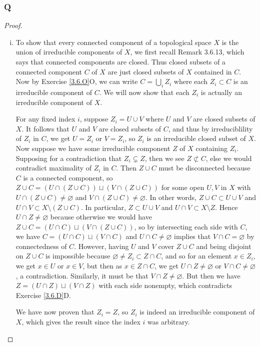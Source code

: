 \documentclass{article}
\newcommand{\nsubset}{\not \subset}
\let\emptyset\varnothing
\begin{document}
\subsubsection{Q}\label{3.6.Q}
\begin{proof}
    \begin{enumerate}[(i)]
        \item To show that every connected component of a topological space $X$ is the union of irreducible components of $X$, we first recall Remark 3.6.13, which says that connected components are closed. Thus closed subsets of a connected component $C$ of $X$ are just closed subsets of $X$ contained in $C$. Now by Exercise \ref{3.6.O}O, we can write $C=\bigcup_i Z_i$ where each $Z_i \subset C$ is an irreducible component of $C$. We will now show that each $Z_i$ is actually an irreducible component of $X$. 
        
        For any fixed index $i$, suppose $Z_i = U \cup V$ where $U$ and $V$ are closed subsets of $X$. It follows that $U$ and $V$ are closed subsets of $C$, and thus by irreduciblility of $Z_i$ in $C$, we get $U=Z_i$ or $V=Z_i$, so $Z_i$ is an irreducible closed subset of $X$. Now suppose we have some irreducible component $Z$ of $X$ containing $Z_i$. Supposing for a contradiction that $Z_i\subsetneq Z$, then we see $Z\nsubset C$, else we would contradict maximality of $Z_i$ in $C$. Then $Z\cup C$ must be disconnected because $C$ is a connected component, so $Z\cup C = (U \cap (Z\cup C)) \sqcup (V \cap (Z\cup C))$ for some open $U,V$ in $X$ with $U\cap (Z\cup C) \ne \emptyset$ and $V\cap (Z\cup C) \ne \emptyset$. In other words, $Z\cup C\subset U\cup V$ and $U\cap V \subset X\setminus (Z\cup C)$. In particular, $Z\subset U\cup V$ and $U\cap V \subset X\setminus Z$. Hence $U\cap Z \ne \emptyset$ because otherwise we would have $Z\cup C = (U\cap C)\sqcup (V\cap(Z\cup C))$, so by intersecting each side with $C$, we have $C=(U\cap C) \sqcup (V\cap C)$ and $U\cap C\ne \emptyset$ implies that $V\cap C = \emptyset$ by connectedness of $C$. However, having $U$ and $V$ cover $Z\cup C$ and being disjoint on $Z\cup C$ is impossible because $\emptyset \ne Z_i \subset Z\cap C$, and so for an element $x\in Z_i$, we get $x\in U$ or $x\in V$, but then as $x\in Z\cap C$, we get $U\cap Z \ne \emptyset$ or $V\cap C \ne \emptyset$, a contradiction. Similarly, it must be that $V\cap Z \ne \emptyset$. But then we have $Z=(U\cap Z)\sqcup (V\cap Z)$ with each side nonempty, which contradicts Exercise \ref{3.6.D}D.

        We have now proven that $Z_i=Z$, so $Z_i$ is indeed an irreducible component of $X$, which gives the result since the index $i$ was arbitrary.


\end{enumerate}
\end{proof}
\end{document}
